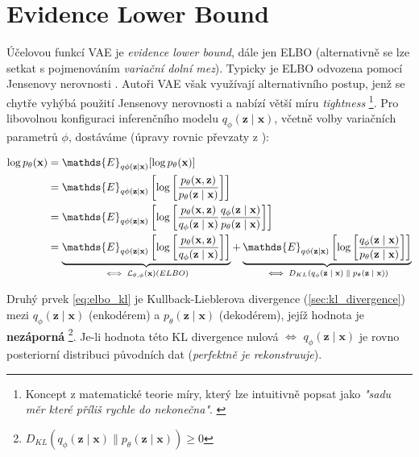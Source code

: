 \section{Evidence Lower Bound}
\label{sec:evidence_lower_bound}
Účelovou funkcí VAE je \emph{evidence lower bound}, dále jen ELBO (alternativně se lze setkat s pojmenováním \emph{variační dolní mez}).
Typicky je ELBO odvozena pomocí Jensenovy nerovnosti \cite[Sekce 4.2]{Wasserman2013}.
Autoři VAE \cite{Kingma2014} však využívají alternativního postup, jenž se chytře vyhýbá použití Jensenovy nerovnosti a nabízí větší míru \emph{tightness}
\footnote{Koncept z matematické teorie míry, který lze intuitivně popsat jako \emph{"sadu měr které příliš rychle  do nekonečna"}. \cite{Topsoee1974}}. 
Pro libovolnou konfiguraci inferenčního modelu $q_\phi(\textbf{z}\mid\textbf{x})$, včetně volby variačních parametrů $\phi$, dostáváme (úpravy rovnic převzaty z \cite{Kingma2019}):

\begin{align}
    \log p_\theta(\textbf{x}) &= \mathds{E}_{q\phi(\textbf{z}\mid\textbf{x})}[\log p_\theta(\textbf{x})] \\
                              &= \mathds{E}_{q\phi(\textbf{z}\mid\textbf{x})} \left[ \log \left[ \frac{p_\theta(\textbf{x}, \textbf{z})}{p_\theta(\textbf{z}\mid\textbf{x})} \right] \right] \\
                              &= \mathds{E}_{q\phi(\textbf{z}\mid\textbf{x})} \left[ \log \left[ \frac{p_\theta(\textbf{x}, \textbf{z})}{q_\phi(\textbf{z}\mid\textbf{x})} \frac{q_\phi(\textbf{z}\mid\textbf{x})}{p_\theta(\textbf{z}\mid\textbf{x})} \right] \right] \\
                              &= \underbrace{ \mathds{E}_{q\phi(\textbf{z}\mid\textbf{x})} \left[ \log \left[ \frac{p_\theta(\textbf{x}, \textbf{z})}{q_\phi(\textbf{z}\mid\textbf{x})} \right] \right] }_\text{$ \iff \mathcal{L}_{\theta,\phi}(\textbf{x}) (ELBO)$} 
                              +  \underbrace{ \mathds{E}_{q\phi(\textbf{z}\mid\textbf{x})} \left[ \log \left[ \frac{q_\phi(\textbf{z}\mid\textbf{x})}{p_\theta(\textbf{z}\mid\textbf{x})} \right] \right] }_\text{$\iff D_{KL}(q_\phi(\textbf{z}\mid\textbf{x})\parallel p_\theta(\textbf{z}\mid\textbf{x}))$} \\ \label{eq:elbo_kl}
\end{align}

Druhý prvek \autoref{eq:elbo_kl} je Kullback-Lieblerova divergence (\autoref{sec:kl_divergence}) mezi $q_\phi(\textbf{z}\mid\textbf{x})$ (enkodérem) a $p_\theta(\textbf{z}\mid\textbf{x})$ (dekodérem), jejíž hodnota je \textbf{nezáporná}
\footnote{$D_{KL}(q_\phi(\textbf{z}\mid\textbf{x})\parallel p_\theta(\textbf{z}\mid\textbf{x})) \geq 0$}.
Je-li hodnota této KL divergence nulová $\iff$ $q_\phi(\textbf{z}\mid\textbf{x})$ je rovno posteriorní distribuci původních dat (\emph{perfektně je rekonstruuje}). \cite{Kingma2019}



